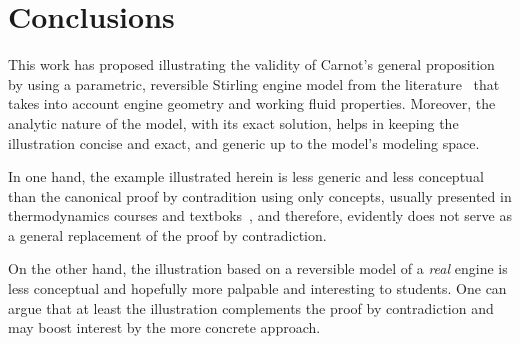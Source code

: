 \section{Conclusions}

    This   work   has   proposed    illustrating    the    validity    of    Carnot's    general
    proposition~\cite{1897-ThurstonRH-Wiley} by using a parametric, reversible  Stirling  engine
    model from the literature~\cite{2012-ChengCH+YangHS-ApEnergy} that takes into account engine
    geometry and working fluid properties. Moreover, the analytic nature of the model, with  its
    exact solution, helps in keeping the illustration concise and exact, and generic up  to  the
    model's modeling space.

    In one hand, the example illustrated herein is less generic and  less  conceptual  than  the
    canonical proof by contradition using only concepts,  usually  presented  in  thermodynamics
    courses    and    textboks~\cite{2013-CengelYA+BolesMA-AMGH,     2002-MoranMJ+ShapiroHN-LTC,
    1986-JonesJB+HawkinsGA-Wiley},  and  therefore,  evidently  does  not  serve  as  a  general
    replacement of the proof by contradiction.

    On the other hand, the illustration based on a reversible model of a \emph{real}  engine  is
    less conceptual and hopefully more palpable and interesting to students. One can argue  that
    at least the illustration complements the proof by contradiction and may boost  interest  by
    the more concrete approach.



